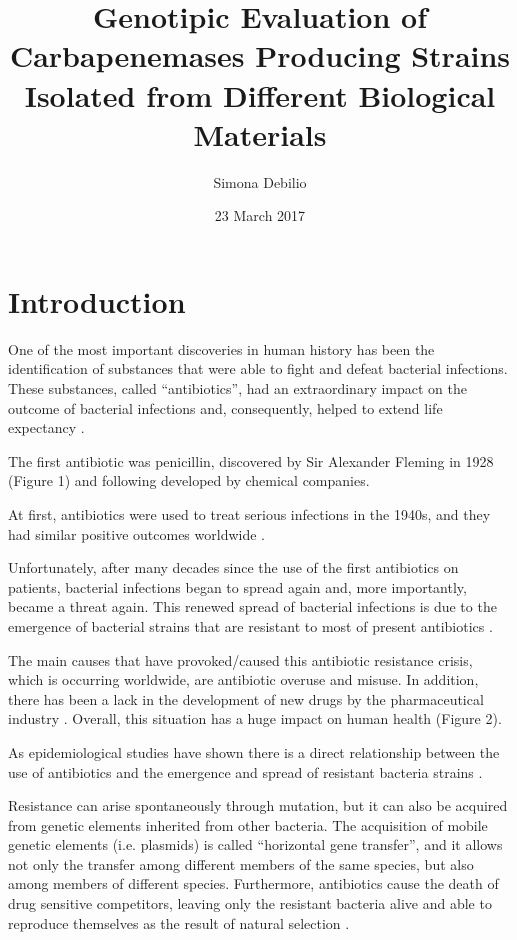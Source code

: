 \documentclass[11pt]{report}
\title{\textbf{Genotipic Evaluation of Carbapenemases Producing Strains Isolated from Different Biological Materials}}
\author{Simona Debilio}
\date{23 March 2017}
\begin{document}
\maketitle

\tableofcontents

\chapter{Introduction}
One of the most important discoveries in human history has been the identification of substances that were able to fight and defeat bacterial infections.
These substances, called “antibiotics”, had an extraordinary impact on the outcome of bacterial infections and, consequently, helped to extend life expectancy \cite{ventola2015antibiotic}.

The first antibiotic was penicillin, discovered by Sir Alexander Fleming in 1928 (Figure 1) and following developed by chemical companies.

At first, antibiotics were used to treat serious infections in the 1940s, and they had similar positive outcomes worldwide \cite{Spellberg2014}.

Unfortunately, after many decades since the use of the first antibiotics on patients, bacterial infections began to spread again and, more importantly, became a threat again.
This renewed spread of bacterial infections is due to the emergence of bacterial strains that are resistant to most of present antibiotics \cite{ventola2015antibiotic}.

The main causes that have provoked/caused this antibiotic resistance crisis, which is occurring worldwide, are antibiotic overuse and misuse.
In addition, there has been a lack in the development of new drugs by the pharmaceutical industry \cite{nature2013}.
Overall, this situation has a huge impact on human health (Figure 2).

As epidemiological studies have shown there is a direct relationship between the use of antibiotics and the emergence and spread of resistant bacteria strains \cite{huttner2013antimicrobial}.

Resistance can arise spontaneously through mutation, but it can also be acquired from genetic elements inherited from other bacteria.
The acquisition of mobile genetic elements (i.e. plasmids) is called “horizontal gene transfer”, and it allows not only the transfer among different members of the same species, but also among members of different species.
Furthermore, antibiotics cause the death of drug sensitive competitors, leaving only the resistant bacteria alive and able to reproduce themselves as the result of natural selection \cite{doi:10.1093/emph/eou024}.
\end{document}
